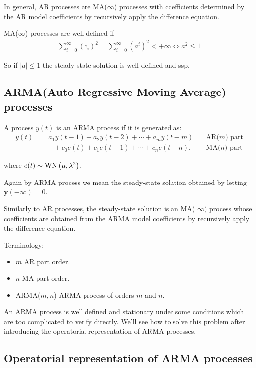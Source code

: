 In general, AR processes are MA($\infty$) processes with coefficients determined by the AR model coefficients by recursively apply the difference equation.

MA($\infty$) processes are well defined if 
\begin{align*}
	\sum_{i=0}^{\infty} \left(c_{i}\right)^2=\sum_{i=0}^{\infty} \left(a^{i}\right)^2< +\infty \iff a^2\leq 1
\end{align*}

So if $|a|\leq1$ the steady-state solution is well defined and \gls{ssp}.

\subsection{ARMA(Auto Regressive Moving Average) processes}

A process $y(t)$ is an ARMA process if it is generated as:
\begin{align*}
	y(t)&=a_{1} y(t-1)+a_{2} y(t-2)+\cdots+a_{m} y(t-m)\quad & \text{AR($m$) part}\\
	&\qquad+c_{0} e(t)+c_{1} e(t-1)+\cdots+c_{n} e(t-n) . \quad & \text{MA($n$) part}
\end{align*}

where $e(t) \sim \operatorname{WN}\left(\mu, \lambda^{2}\right)$.

Again by ARMA process we mean the steady-state solution obtained by letting $\mathbf{y}(-\infty)=0$.
 
Similarly to AR processes, the steady-state solution is an MA( $\infty)$ process whose coefficients are obtained from the ARMA model coefficients by recursively apply the difference equation.
 
Terminology:
\begin{itemize}
	\item $m$ AR part order.
	\item $n$ MA part order.
	\item ARMA($m,n$) ARMA process of orders $m$ and $n$.
\end{itemize}

An ARMA process is well defined and stationary under some conditions which are too complicated to verify directly.
We'll see how to solve this problem after introducing the operatorial 
representation of ARMA processes.

\subsection{Operatorial representation of ARMA processes}

